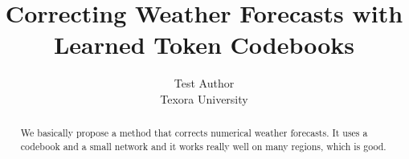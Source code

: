 \documentclass[10pt,twocolumn]{article}
\title{Correcting Weather Forecasts with Learned Token Codebooks}
\author{Test Author\\Texora University}
\date{}
\begin{document}
\maketitle

\begin{abstract}
We basically propose a method that corrects numerical weather forecasts. It uses a codebook and a small network and it works really well on many regions, which is good.
\end{abstract}







\end{document}
